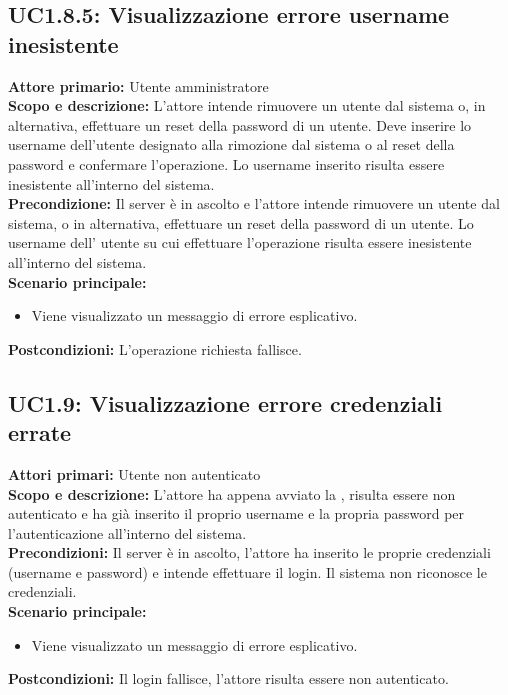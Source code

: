 \documentclass{scalatekids-article}
\begin{document}
\subsection{UC1.8.5: Visualizzazione errore username inesistente}

\textbf{Attore primario:} Utente amministratore\\
\textbf{Scopo e descrizione:} L'attore intende rimuovere un utente dal sistema o, in alternativa, effettuare un reset della password di un utente. Deve inserire lo username dell'utente designato
alla rimozione dal sistema o al reset della password e confermare l'operazione.
Lo username inserito risulta essere inesistente all'interno del sistema.\\
\textbf{Precondizione:} Il server è in ascolto e l'attore intende rimuovere un utente dal sistema, o in alternativa, effettuare un reset della password di un utente.
Lo username dell' utente su cui effettuare l'operazione risulta essere inesistente all'interno del sistema.\\
\textbf{Scenario principale:}
\begin{itemize}
\item Viene visualizzato un messaggio di errore esplicativo.
\end{itemize}
\textbf{Postcondizioni:} L'operazione richiesta fallisce.

\subsection{UC1.9: Visualizzazione errore credenziali errate}

\textbf{Attori primari:} Utente non autenticato\\
\textbf{Scopo e descrizione:}
L'attore ha appena avviato la , risulta essere non autenticato e ha già inserito il proprio username e la propria password per l'autenticazione all'interno del sistema.\\
\textbf{Precondizioni:} Il server è in ascolto, l'attore ha inserito le proprie credenziali (username e password) e intende effettuare il login. Il sistema non riconosce le credenziali.\\
\textbf{Scenario principale:}
\begin{itemize}
\item Viene visualizzato un messaggio di errore esplicativo.
\end{itemize}
\textbf{Postcondizioni:} Il login fallisce, l'attore risulta essere non autenticato.
\end{document}
